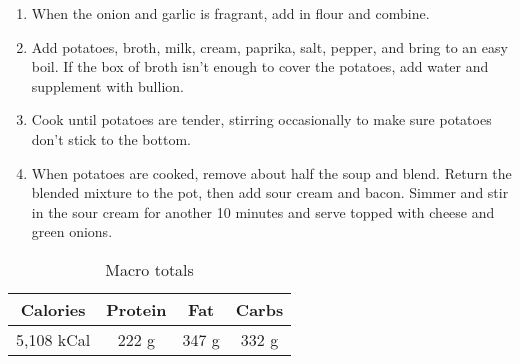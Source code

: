 \documentclass{report}
\begin{document}
\begin{multicols}{2}
\begin{enumerate}
\item When the onion and garlic is fragrant, add in flour and combine. 

\item Add potatoes, broth, milk, cream, paprika, salt, pepper, and bring to an easy boil. If the box of broth isn't enough to cover the potatoes, add water and supplement with bullion. 
\item Cook until potatoes are tender, stirring occasionally to make sure potatoes don't stick to the bottom. 
\item When potatoes are cooked, remove about half the soup and blend. Return the blended mixture to the pot, then add sour cream and bacon. Simmer and stir in the sour cream for another 10 minutes and serve topped with cheese and green onions. 
  
\end{enumerate}
\begin{table}[H]
  \begin{center}
    \caption{Macro totals}
    \label{tab:table1}
    \begin{tabular}{c|c|c|c} %
      \textbf{Calories} & \textbf{Protein} & \textbf{Fat} & \textbf{Carbs}\\
      \hline
      5,108 kCal & 222 g & 347 g & 332 g\\
    \end{tabular}
  \end{center}
\end{table}
\end{multicols}




\end{document}
